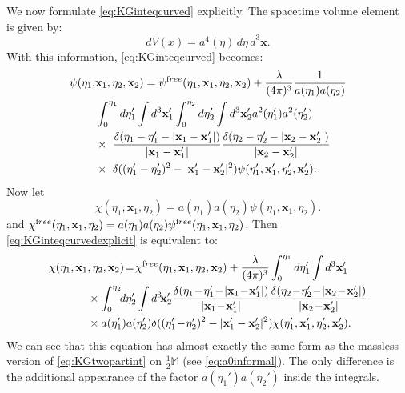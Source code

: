 \documentclass[b5paper,draft,openbib,12pt]{memoir}
\newcommand{\M}{\mathbb{M}}
\newcommand{\vx}{\mathbf{x}}
\newcommand{\free}{{\textup free}}
\begin{document}
We now formulate \eqref{eq:KGinteqcurved} explicitly. 
The spacetime volume element is given by:
\begin{equation}
	dV(x) = a^4(\eta) \, d\eta \, d^3 \vx.
\end{equation}
With this information, \eqref{eq:KGinteqcurved} becomes:
\begin{align}
  \psi(\eta_1,&\vx_1,\eta_2,\vx_2) = \psi^\free(\eta_1,\vx_1,\eta_2,\vx_2) + \frac{\lambda}{(4\pi)^3} \frac{1}{a(\eta_1) a(\eta_2)} \notag\\
&\int_0^{\eta_1} d \eta_1' \int d^3 \vx_1' \int_0^{\eta_2} d \eta_2' \int d^3  \vx_2' a^2(\eta_1') a^2(\eta_2')\nonumber\\
&\times ~\frac{\delta(\eta_1-\eta_1' - |\vx_1-\vx_1'|)}{|\vx_1-\vx_1'|}\frac{\delta(\eta_2-\eta_2' - |\vx_2-\vx_2'|)}{|\vx_2-\vx_2'|}\nonumber\\
&\times ~\delta((\eta_1'-\eta_2')^2-|\vx_1'-\vx_2'|^2) \psi(\eta_1',\vx_1',\eta_2',\vx_2').
\label{eq:KGinteqcurvedexplicit}
\end{align}
Now let
\begin{equation}
	\chi(\eta_1,\vx_1,\eta_2) = a(\eta_1) a(\eta_2) \psi(\eta_1,\vx_1,\eta_2).
\end{equation}
and $\chi^\free(\eta_1,\vx_1,\eta_2) = a(\eta_1) a(\eta_2) \psi^\free(\eta_1,\vx_1,\eta_2)$.
Then \eqref{eq:KGinteqcurvedexplicit} is equivalent to:
\begin{align}\label{eq:KGinteqcurvedexplicitchi}
	\chi(\eta_1,\vx_1&,\eta_2,\vx_2)\! =\! \chi^\free(\eta_1,\vx_1,\eta_2,\vx_2) + \frac{\lambda}{(4\pi)^3} \int_0^{\eta_1} d \eta_1' \int d^3 \vx_1' \\
&\times \int_0^{\eta_2} \!\!d \eta_2' \int d^3\!  \vx_2' \frac{\delta(\eta_1\!-\!\eta_1'\! -\! |\vx_1\!-\!\vx_1'|)}{|\vx_1\!-\!\vx_1'|}\frac{\delta(\eta_2\!-\!\eta_2' \!-\! |\vx_2\!-\!\vx_2'|)}{|\vx_2\!-\!\vx_2'|}\nonumber\\
&\times  a(\eta_1') a(\eta_2') \delta((\eta_1'\!-\!\eta_2')^2-|\vx_1'-\vx_2'|^2) \chi(\eta_1',\vx_1',\eta_2',\vx_2').\notag
\end{align}
We can see that this equation has almost exactly the 
same form as the massless version of \eqref{eq:KGtwopartint} 
on $\tfrac{1}{2}\M$ (see \eqref{eq:a0informal}). The 
only difference is the additional appearance of the 
factor $a(\eta_1') a(\eta_2')$ inside the integrals.
\end{document}

